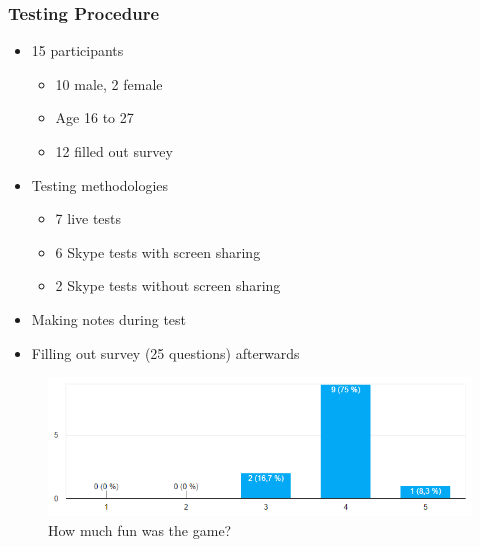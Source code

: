 \documentclass[xcolor=dvipsnames]{beamer}
\begin{document}
	\begin{frame}
		\frametitle{Testing Procedure}
		\begin{itemize}
			\item 15 participants
			\begin{itemize}
				\item 10 male, 2 female
				\item Age 16 to 27
				\item 12 filled out survey
			\end{itemize}
			\item Testing methodologies
			\begin{itemize}
				\item 7 live tests
				\item 6 Skype tests with screen sharing
				\item 2 Skype tests without screen sharing
			\end{itemize}
			\item Making notes during test
			\item Filling out survey (25 questions) afterwards
		\end{itemize}

		 \begin{figure}[H]
		 	\centering
		 	\includegraphics[scale=.4]{images/playtesting/fun}
		 	\caption{How much fun was the game?}
		 \end{figure}
	\end{frame}
	
\end{document}
